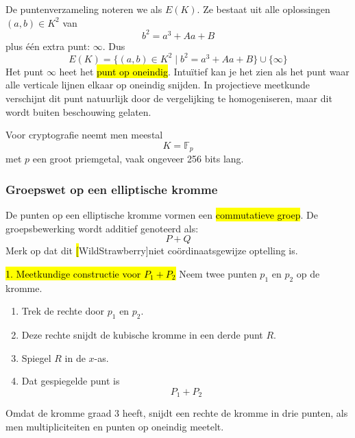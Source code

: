 De puntenverzameling noteren we als $E(K)$. Ze bestaat uit alle oplossingen $(a,b) \in K^2$ van
\begin{equation*}
    b^2 = a^3 + Aa + B
\end{equation*}
plus één extra punt: $\infty$. Dus
\begin{equation*}
    E(K) = \{(a,b) \in K^2 \mid b^2 = a^3 + Aa + B\} \cup \{\infty\}
\end{equation*}
Het punt $\infty$ heet het \hl{punt op oneindig}. Intuïtief kan je het zien als het punt waar alle verticale lijnen elkaar op oneindig snijden. In projectieve meetkunde verschijnt dit punt natuurlijk door de vergelijking te homogeniseren, maar dit wordt buiten beschouwing gelaten.

Voor cryptografie neemt men meestal
\begin{equation*}
    K = \mathbb{F}_p
\end{equation*}
met $p$ een groot priemgetal, vaak ongeveer 256 bits lang.

\subsubsection{Groepswet op een elliptische kromme}

De punten op een elliptische kromme vormen een \hl{commutatieve groep}. De groepsbewerking wordt additief genoteerd als:
\begin{equation*}
    P+Q
\end{equation*}
Merk op dat dit \hl[WildStrawberry]{niet} coördinaatsgewijze optelling is.

\hl{1. Meetkundige constructie voor $P_1 + P_2$} \newline
Neem twee punten $p_1$ en $p_2$ op de kromme.
\begin{enumerate}
    \item Trek de rechte door $p_1$ en $p_2$.
    \item Deze rechte snijdt de kubische kromme in een derde punt $R$.
    \item Spiegel $R$ in de $x$-as.
    \item Dat gespiegelde punt is
    \begin{equation*}
        P_1 + P_2
    \end{equation*}
\end{enumerate}
Omdat de kromme graad 3 heeft, snijdt een rechte de kromme in drie punten, als men multipliciteiten en punten op oneindig meetelt.

\begin{center}
\resizebox{1.0\textwidth}{!}{%
    
}
\end{center}

